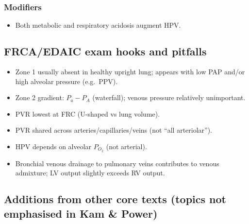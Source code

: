 \documentclass[11pt,a4paper]{article}
\begin{document}
\subsubsection{Modifiers}
\begin{itemize}
  \item Both metabolic and respiratory acidosis augment HPV.
\end{itemize}

\subsection{FRCA/EDAIC exam hooks and pitfalls}
\begin{itemize}
  \item Zone 1 usually absent in healthy upright lung; appears with low PAP and/or high alveolar pressure (e.g.\ PPV).
  \item Zone 2 gradient: \(P_a - P_A\) (waterfall); venous pressure relatively unimportant.
  \item PVR lowest at FRC (U-shaped vs lung volume).
  \item PVR shared across arteries/capillaries/veins (not ``all arteriolar'').
  \item HPV depends on alveolar \(P_{O_2}\) (not arterial).
  \item Bronchial venous drainage to pulmonary veins contributes to venous admixture; LV output slightly exceeds RV output.
\end{itemize}

\subsection{Additions from other core texts (topics not emphasised in Kam \& Power)}
\end{document}
